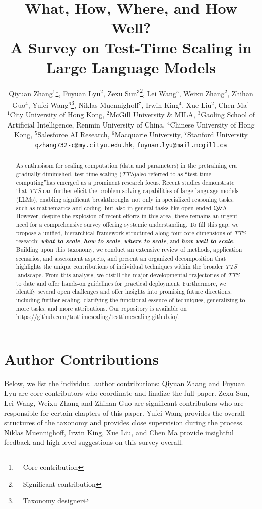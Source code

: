 \documentclass{article}
\title{What, How, Where, and How Well? \\ A Survey on Test-Time Scaling in Large Language Models}
\author{Qiyuan Zhang$^{1}$\thanks{~~Core contribution}\hspace{0.5em}, Fuyuan Lyu$^{2}$\samethanks\hspace{0.5em}, 
Zexu Sun$^{3}$\thanks{~~Significant contribution}\hspace{0.5em}, Lei Wang$^{5}$\samethanks\hspace{0.5em}, Weixu Zhang$^{2}$\samethanks\hspace{0.5em}, Zhihan Guo$^{4}$\samethanks\hspace{0.5em}, 
Yufei Wang$^{6}$\thanks{~~Taxonomy designer}\hspace{0.5em}, Niklas Muennighoff$^{7}$, Irwin King$^{4}$, Xue Liu$^{2}$, Chen Ma$^{1}$\\

$^{1}$City University of Hong Kong,
$^{2}$McGill University \& MILA,
$^{3}$Gaoling School of Artificial Intelligence, Renmin University of China,
$^{4}$Chinese University of Hong Kong,
$^{5}$Salesforce AI Research,   
$^{6}$Macquarie University,
$^{7}$Stanford University\\
\texttt{qzhang732-c@my.cityu.edu.hk}, 
\texttt{fuyuan.lyu@mail.mcgill.ca} \\}
\begin{document}
\maketitle

\begin{abstract}
As enthusiasm for scaling computation (data and parameters) in the pretraining era gradually diminished, test-time scaling (\textit{TTS})\textemdash{}also referred to as ``test-time computing''\textemdash{}has emerged as a prominent research focus. Recent studies demonstrate that \textit{TTS} can further elicit the problem-solving capabilities of large language models (LLMs), enabling significant breakthroughs not only in specialized reasoning tasks, such as mathematics and coding, but also in general tasks like open-ended Q\&A.
However, despite the explosion of recent efforts in this area,
there remains an urgent need for a comprehensive survey offering systemic understanding.
To fill this gap, we propose a unified, hierarchical framework structured along four core dimensions of \textit{TTS} research: \textbf{\textit{what to scale}}, \textbf{\textit{how to scale}}, \textbf{\textit{where to scale}}, and \textbf{\textit{how well to scale}}. 
Building upon this taxonomy, we conduct an extensive review of methods, application scenarios, and assessment aspects, and present an organized decomposition that highlights the unique contributions of individual techniques within the broader \textit{TTS} landscape. From this analysis, we distill the major developmental trajectories of \textit{TTS} to date and offer hands-on guidelines for practical deployment. Furthermore, we identify several open challenges and offer insights into promising future directions, including further scaling, clarifying the functional essence of techniques, generalizing to more tasks, and more attributions.
Our repository is available on \url{https://github.com/testtimescaling/testtimescaling.github.io/}.
\end{abstract}



% 











\section*{Author Contributions}
Below, we list the individual author contributions: Qiyuan Zhang and Fuyuan Lyu are core contributors who coordinate and finalize the full paper. Zexu Sun, Lei Wang, Weixu Zhang and Zhihan Guo are significant contributors who are responsible for certain chapters of this paper. Yufei Wang provides the overall structures of the taxonomy and provides close supervision during the process. Niklas Muennighoff, Irwin King, Xue Liu, and Chen Ma provide insightful feedback and high-level suggestions on this survey overall.
\end{document}
